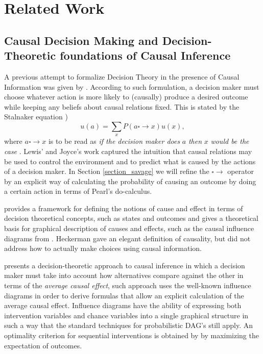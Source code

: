 \documentclass{svjour3}                     %
\begin{document}
\section{Related Work}
\label{related_work}
\subsection{Causal Decision Making and Decision-Theoretic foundations of Causal Inference}
\label{joyce_theory}
A previous attempt to formalize Decision Theory in the presence of Causal Information was given by \cite{lewis1981causal,joyce1999foundations}. According to such formulation, a decision maker must choose whatever action is more likely to (causally) produce a desired outcome while keeping any beliefs about causal relations fixed. This is stated by the Stalnaker equation \citep{stalnaker1968})
\begin{equation}
u(a)=\sum_{x} P(a \square \to x)u(x),
\end{equation}
\noindent
where $a \square \to x$ is to be read as \textit{if the decision maker does} $a$ \textit{then} $x$ \textit{would be the case} \citep{gibbard1978counterfactuals,kleinberg2013causality}. Lewis' and Joyce's work captured the intuition that causal relations may be used to control the environment and to predict what is caused by the actions of a decision maker. In Section \ref{section_savage} we will refine the $\square \to$ operator by an explicit way of calculating the probability of causing an outcome by doing a certain action in terms of Pearl's do-calculus.

\cite{heckerman1995decision} provides a framework for defining the notions of cause and effect in terms of decision theoretical concepts, such as states and outcomes and gives a theoretical basis for graphical description of causes and effects, such as the causal influence diagrams from \citep{dawid2002influence}. Heckerman gave an elegant definition of causality, but did not address how to actually make choices using causal information.

\cite{dawid2012decision} presents a decision-theoretic approach to causal inference in which a decision maker must take into account how alternatives compare against the other in terms of the \textit{average causal effect}, such approach uses the well-known influence diagrams \citep{dawid2002influence,dawid2003causal} in order to derive formulas that allow an explicit calculation of the average causal effect. Influence diagrams have the ability of expressing both intervention variables and chance variables into a single graphical structure in such a way that the standard techniques for probabilistic DAG's still apply. An optimality criterion for sequential interventions is obtained by \cite{dawid2008identifying} by maximizing the expectation of outcomes.
\end{document}

